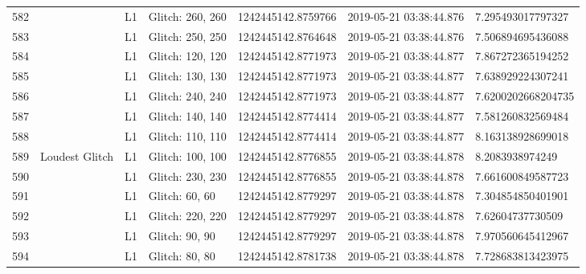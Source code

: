 \begin{longtable}{lllllll}
582  &                                                    &       L1 &  Glitch: 260, 260 &  1242445142.8759766 &  2019-05-21 03:38:44.876 &   7.295493017797327 \\
583  &                                                    &       L1 &  Glitch: 250, 250 &  1242445142.8764648 &  2019-05-21 03:38:44.876 &   7.506894695436088 \\
584  &                                                    &       L1 &  Glitch: 120, 120 &  1242445142.8771973 &  2019-05-21 03:38:44.877 &   7.867272365194252 \\
585  &                                                    &       L1 &  Glitch: 130, 130 &  1242445142.8771973 &  2019-05-21 03:38:44.877 &   7.638929224307241 \\
586  &                                                    &       L1 &  Glitch: 240, 240 &  1242445142.8771973 &  2019-05-21 03:38:44.877 &  7.6200202668204735 \\
587  &                                                    &       L1 &  Glitch: 140, 140 &  1242445142.8774414 &  2019-05-21 03:38:44.877 &   7.581260832569484 \\
588  &                                                    &       L1 &  Glitch: 110, 110 &  1242445142.8774414 &  2019-05-21 03:38:44.877 &   8.163138928699018 \\
589  &                                     Loudest Glitch &       L1 &  Glitch: 100, 100 &  1242445142.8776855 &  2019-05-21 03:38:44.878 &     8.2083938974249 \\
590  &                                                    &       L1 &  Glitch: 230, 230 &  1242445142.8776855 &  2019-05-21 03:38:44.878 &   7.661600849587723 \\
591  &                                                    &       L1 &    Glitch: 60, 60 &  1242445142.8779297 &  2019-05-21 03:38:44.878 &   7.304854850401901 \\
592  &                                                    &       L1 &  Glitch: 220, 220 &  1242445142.8779297 &  2019-05-21 03:38:44.878 &    7.62604737730509 \\
593  &                                                    &       L1 &    Glitch: 90, 90 &  1242445142.8779297 &  2019-05-21 03:38:44.878 &   7.970560645412967 \\
594  &                                                    &       L1 &    Glitch: 80, 80 &  1242445142.8781738 &  2019-05-21 03:38:44.878 &   7.728683813423975 \\

\end{longtable}

